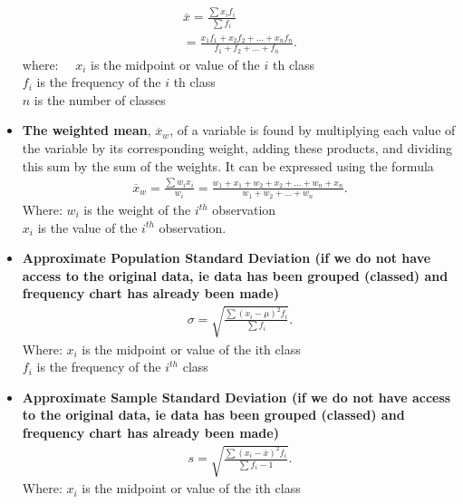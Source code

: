 \documentclass{report}
\begin{document}
\begin{itemize}
                \begin{align*}
                    \overline{x} = \frac{\sum x_{i}f_{i}}{\sum f_{i}} \\
                     = \frac{x_{1}f_{1} + x_{2} f_{2} + ... +x_{n} f_{n}}{f_{1} + f_{2} + ... + f_{n}}
                .\end{align*}
            where: $\quad x_i$ is the midpoint or value of the $i$ th class  \\
            $f_i$ is the frequency of the $i$ th class  \\
            $n$ is the number of classes
            \item \textbf{The weighted mean}, $\overline{x}_{w}$, of a variable is found by multiplying each value of the variable by its corresponding weight, adding these products, and dividing this sum by the sum of the weights. It can be expressed using the formula
                \begin{align*}
                    \overline{x}_{w} = \frac{\sum w_{i}x_{i}}{w_{i}} = \frac{w_{1} + x_{1} + w_{2} + x_{2} + ... + w_{n} + x_{n}}{w_{1} + w_{2} + ... + w_{n}}
                .\end{align*}
                Where: \quad $w_{i}$ is the weight of the $i^{th}$ observation \\
                $x_{i}$ is the value of the $i^{th}$ observation.
            \item \textbf{Approximate Population Standard Deviation (if we do not have access to the original data, ie data has been grouped (classed) and frequency chart has already been made)}
                \begin{align*}
                    \sigma = \sqrt{\frac{\sum(x_{i} - \mu)^{2}f_{i}}{\sum f_{i}}}
                .\end{align*}
                Where: \quad  $x_{i}$ is the midpoint or value of the ith class \\
                $f_{i}$ is the frequency of the $i^{th}$ class
            \item \textbf{Approximate Sample Standard Deviation (if we do not have access to the original data, ie data has been grouped (classed) and frequency chart has already been made)}
                \begin{align*}
                    s = \sqrt{\frac{\sum(x_{i}-\overline{x})^{2}f_{i}}{\sum f_{i} -1}}
                .\end{align*}
                Where: \quad  $x_{i}$ is the midpoint or value of the ith class \\

\end{itemize}
\end{document}
